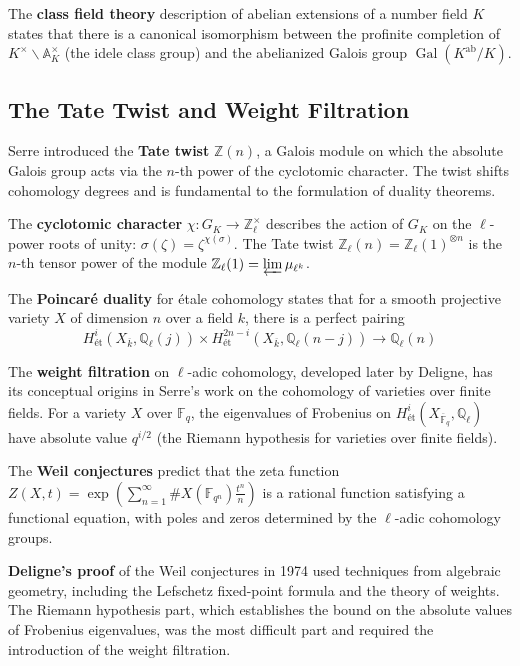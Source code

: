 The \textbf{class field theory} description of abelian extensions of a number field $K$ states that there is a canonical isomorphism between the profinite completion of $K^\times \backslash \mathbb{A}_K^\times$ (the idele class group) and the abelianized Galois group $\operatorname{Gal}(K^{\text{ab}}/K)$.

\subsection{The Tate Twist and Weight Filtration}

Serre introduced the \textbf{Tate twist} $\mathbb{Z}(n)$, a Galois module on which the absolute Galois group acts via the $n$-th power of the cyclotomic character. The twist shifts cohomology degrees and is fundamental to the formulation of duality theorems.

The \textbf{cyclotomic character} $\chi: G_K \to \mathbb{Z}_\ell^\times$ describes the action of $G_K$ on the $\ell$-power roots of unity: $\sigma(\zeta) = \zeta^{\chi(\sigma)}$. The Tate twist $\mathbb{Z}_\ell(n) = \mathbb{Z}_\ell(1)^{\otimes n}$ is the $n$-th tensor power of the module $\mathbb{Z}_\ell(1) = \varprojlim \mu_{\ell^k}$.

The \textbf{Poincaré duality} for étale cohomology states that for a smooth projective variety $X$ of dimension $n$ over a field $k$, there is a perfect pairing
\[H^i_{\text{ét}}(X_{\overline{k}}, \mathbb{Q}_\ell(j)) \times H^{2n-i}_{\text{ét}}(X_{\overline{k}}, \mathbb{Q}_\ell(n-j)) \to \mathbb{Q}_\ell(n)\]

The \textbf{weight filtration} on $\ell$-adic cohomology, developed later by Deligne, has its conceptual origins in Serre's work on the cohomology of varieties over finite fields. For a variety $X$ over $\mathbb{F}_q$, the eigenvalues of Frobenius on $H^i_{\text{ét}}(X_{\overline{\mathbb{F}}_q}, \mathbb{Q}_\ell)$ have absolute value $q^{i/2}$ (the Riemann hypothesis for varieties over finite fields).

The \textbf{Weil conjectures} predict that the zeta function $Z(X, t) = \exp\left(\sum_{n=1}^\infty \#X(\mathbb{F}_{q^n}) \frac{t^n}{n}\right)$ is a rational function satisfying a functional equation, with poles and zeros determined by the $\ell$-adic cohomology groups.

\textbf{Deligne's proof} of the Weil conjectures in 1974 used techniques from algebraic geometry, including the Lefschetz fixed-point formula and the theory of weights. The Riemann hypothesis part, which establishes the bound on the absolute values of Frobenius eigenvalues, was the most difficult part and required the introduction of the weight filtration.

